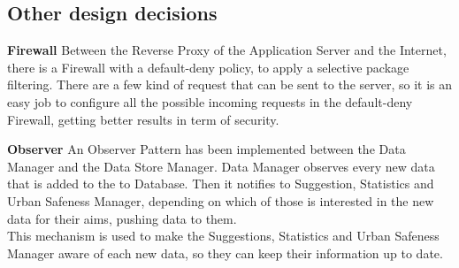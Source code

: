 \subsection{Other design decisions}
\textbf{Firewall}\newline
Between the Reverse Proxy of the Application Server and the Internet, there is a Firewall with a default-deny policy, to apply a selective package filtering. There are a few kind of request that can be sent to the server, so it is an easy job to configure all the possible incoming requests in the default-deny Firewall, getting better results in term of security.\newline 

\noindent \textbf{Observer}\newline
An Observer Pattern has been implemented between the Data Manager and the Data Store Manager. Data Manager observes every new data that is added to the to Database. Then it notifies to Suggestion, Statistics and Urban Safeness Manager, depending on which of those is interested in the new data for their aims, pushing data to them.\\
This mechanism is used to make the Suggestions, Statistics and Urban Safeness Manager aware of each new data, so they can keep their information up to date.